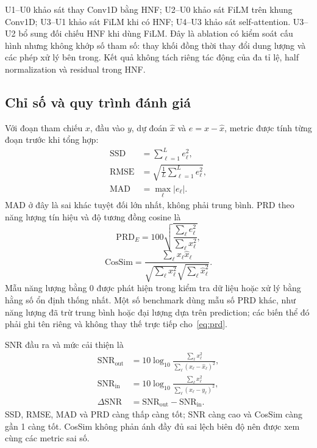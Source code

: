 \documentclass[conference]{IEEEtran}
\begin{document}
U1--U0 khảo sát thay Conv1D bằng HNF; U2--U0 khảo sát FiLM trên khung Conv1D; U3--U1 khảo sát FiLM khi có HNF; U4--U3 khảo sát self-attention. U3--U2 bổ sung đối chiếu HNF khi dùng FiLM. Đây là ablation có kiểm soát cấu hình nhưng không khớp số tham số: thay khối đồng thời thay đổi dung lượng và các phép xử lý bên trong. Kết quả không tách riêng tác động của đa tỉ lệ, half normalization và residual trong HNF.

\subsection{Chỉ số và quy trình đánh giá}
Với đoạn tham chiếu $x$, đầu vào $y$, dự đoán $\hat x$ và $e=x-\hat x$, metric được tính từng đoạn trước khi tổng hợp:
\begin{equation}
 \begin{aligned}
 \mathrm{SSD}&=\sum_{\ell=1}^{L}e_\ell^2,\\
 \mathrm{RMSE}&=\sqrt{\frac{1}{L}\sum_{\ell=1}^{L}e_\ell^2},\\
 \mathrm{MAD}&=\max_{\ell}|e_\ell|.
 \end{aligned}
\end{equation}
MAD ở đây là sai khác tuyệt đối lớn nhất, không phải trung bình. PRD theo năng lượng tín hiệu và độ tương đồng cosine là
\begin{equation}
 \mathrm{PRD}_{E}=100\sqrt{\frac{\sum_\ell e_\ell^2}{\sum_\ell x_\ell^2}},
 \label{eq:prd}
\end{equation}
\begin{equation}
 \mathrm{CosSim}=\frac{\sum_\ell x_\ell\hat x_\ell}
 {\sqrt{\sum_\ell x_\ell^2}\sqrt{\sum_\ell\hat x_\ell^2}}.
\end{equation}
Mẫu năng lượng bằng 0 được phát hiện trong kiểm tra dữ liệu hoặc xử lý bằng hằng số ổn định thống nhất. Một số benchmark dùng mẫu số PRD khác, như năng lượng đã trừ trung bình hoặc đại lượng dựa trên prediction; các biến thể đó phải ghi tên riêng và không thay thế trực tiếp cho~\eqref{eq:prd}.

SNR đầu ra và mức cải thiện là
\begin{equation}
 \begin{aligned}
 \mathrm{SNR}_{\mathrm{out}}&=10\log_{10}
    \frac{\sum_\ell x_\ell^2}{\sum_\ell (x_\ell-\hat x_\ell)^2},\\
 \mathrm{SNR}_{\mathrm{in}}&=10\log_{10}
    \frac{\sum_\ell x_\ell^2}{\sum_\ell (x_\ell-y_\ell)^2},\\
 \Delta\mathrm{SNR}&=\mathrm{SNR}_{\mathrm{out}}-\mathrm{SNR}_{\mathrm{in}}.
 \end{aligned}
\end{equation}
SSD, RMSE, MAD và PRD càng thấp càng tốt; SNR càng cao và CosSim càng gần 1 càng tốt. CosSim không phản ánh đầy đủ sai lệch biên độ nên được xem cùng các metric sai số.
\end{document}
